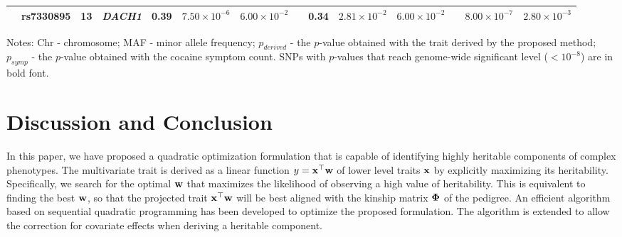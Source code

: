 \documentclass[10pt,letterpaper]{article}
\newcommand{\matrx}[1]{\ensuremath\boldsymbol{\rm #1}}
\newcommand{\vect}[1]{\ensuremath\boldsymbol{\rm #1}}
\begin{document}
\begin{table}[t]
\begin{adjustwidth}{-2.25in}{0in}
\begin{center}
\begin{scriptsize}
\begin{tabular}{llcccccccccccc}
				& rs7330895     & 13  &  \textit{DACH1}  & 0.39 & $7.50\times 10^{-6}$ & $6.00\times 10^{-2}$ && 0.34 & $2.81\times 10^{-2}$ & $6.00\times 10^{-2}$ && $8.00\times 10^{-7}$ & $2.80\times 10^{-3}$ \\
				\bottomrule
			\end{tabular}
		\end{scriptsize}
	\end{center}
	{\footnotesize Notes: Chr - chromosome; MAF - minor allele frequency; $p_{derived}$ - the $p$-value obtained with the trait derived by the proposed method; $p_{symp}$ - the $p$-value obtained with the cocaine symptom count.} 
	{\footnotesize SNPs with $p$-values that reach genome-wide significant level ($<10^{-8}$) are in bold font. }
	\vskip -0.1in
\end{adjustwidth}
\end{table}

\section*{Discussion and Conclusion}
\label{sec:discussion}
In this paper, we have proposed a quadratic optimization formulation that is capable of identifying highly heritable components of complex phenotypes. The multivariate trait is derived as a linear function $y=\vect x^\top \vect w$ of lower level traits $\vect x$ by explicitly maximizing its heritability. Specifically, we search for the optimal $\vect w$ that maximizes the likelihood of observing a high value of heritability. This is equivalent to finding the best $\vect w$, so that the projected trait $\vect x^\top \vect w$ will be best aligned with the kinship matrix $\matrx \Phi$ of the pedigree. An efficient algorithm based on sequential quadratic programming has been developed to optimize the proposed formulation. The algorithm is extended to allow the correction for  covariate effects when deriving a heritable component. 
\end{document}
